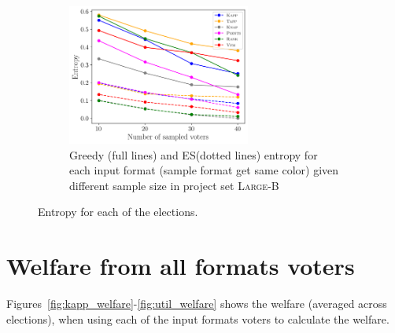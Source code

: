 \documentclass{comsoc2023}
\newcommand{\knap}{\textsc{Knap}}
\newcommand{\kapp}{\textsc{Kapp}}
\newcommand{\mes}{ES}
\begin{document}
\begin{figure}[!h]
\begin{subfigure}[b]{0.45\textwidth}
     \end{subfigure}
     \hfill
     \begin{subfigure}[b]{0.45\textwidth}
         \centering
         \includegraphics[width=6cm]{experiment/entropy_large_b.png}
\caption{Greedy (full lines) and \mes (dotted lines) entropy  for each input format (sample format get same color) given different sample size in project set \textsc{Large-B} }\label{fig:entropy_lb}
     \end{subfigure}

        \caption{Entropy for each of the elections.}
        \label{fig:app_entropy}
\end{figure}


\section{Welfare from all formats voters}\label{app:aggregation}
Figures~\ref{fig:kapp_welfare}-\ref{fig:util_welfare} shows the welfare (averaged across elections), when using each of the input formats voters to calculate the welfare.



\end{document}
